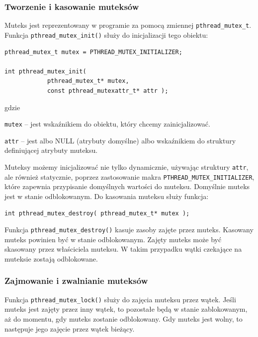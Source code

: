 \subsubsection{Tworzenie i kasowanie muteksów}

Muteks jest reprezentowany w programie za pomocą zmiennej \lstinline[style=MyCStyle]{pthread_mutex_t}. Funkcja \lstinline[style=MyCStyle]{pthread_mutex_init()} służy do inicjalizacji tego obiektu:

\begin{lstlisting}[style=MyCStyle]
pthread_mutex_t mutex = PTHREAD_MUTEX_INITIALIZER;

int pthread_mutex_init(
            pthread_mutex_t* mutex,
            const pthread_mutexattr_t* attr );
\end{lstlisting}


gdzie
\begin{myitemize}
\item \lstinline[style=MyCStyle]{mutex} -- jest wskaźnikiem do obiektu, który chcemy zainicjalizować.
\item \lstinline[style=MyCStyle]{attr} -- jest albo NULL (atrybuty domyślne) albo wskaźnikiem do struktury definiującej atrybuty muteksu.
\end{myitemize}

Muteksy możemy inicjalizować nie tylko dynamicznie, używając struktury \lstinline[style=MyCStyle]{attr}, ale również  statycznie, poprzez zastosowanie makra \lstinline[style=MyCStyle]{PTHREAD_MUTEX_INITIALIZER}, które zapewnia przypisanie domyślnych wartości do muteksu. Domyślnie muteks jest w stanie odblokowanym.
Do kasowania muteksu służy funkcja:

\begin{lstlisting}[style=MyCStyle]
int pthread_mutex_destroy( pthread_mutex_t* mutex );
\end{lstlisting}

Funkcja \lstinline[style=MyCStyle]{pthread_mutex_destroy()} kasuje zasoby zajęte przez muteks. Kasowany muteks powinien być w stanie odblokowanym. Zajęty muteks może być skasowany przez właściciela muteksu. W takim przypadku wątki czekające na muteksie zostają odblokowane.

\subsubsection{Zajmowanie i zwalnianie muteksów}

Funkcja  \lstinline[style=MyCStyle]{pthread_mutex_lock()} służy do zajęcia muteksu przez wątek. Jeśli muteks jest zajęty przez inny wątek, to pozostałe będą w stanie zablokowanym, aż do momentu, gdy muteks zostanie odblokowany. Gdy muteks jest wolny, to następuje jego zajęcie przez wątek bieżący.

